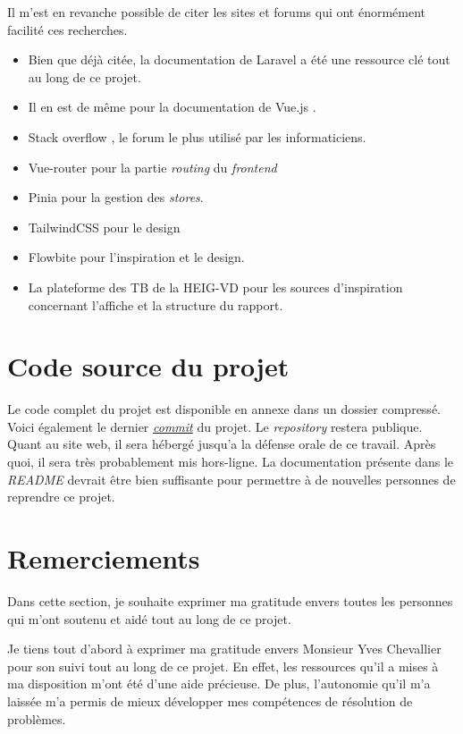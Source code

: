Il m'est en revanche possible de citer les sites et forums qui ont énormément facilité ces recherches.

\begin{itemize}
    \item Bien que déjà citée, la documentation de Laravel \cite{Laravel} a été une ressource clé tout au long de ce projet.
    \item Il en est de même pour la documentation de Vue.js \cite{Vuejs}.
    \item Stack overflow \cite{stackoverflow}, le forum le plus utilisé par les informaticiens.
    \item Vue-router \cite{vueRouter} pour la partie \emph{routing} du \emph{frontend}
    \item Pinia \cite{pinia} pour la gestion des \emph{stores}.
    \item TailwindCSS \cite{TailwindCSS} pour le design
    \item Flowbite \cite{flowbite} pour l'inspiration et le design.
    \item La plateforme des TB de la HEIG-VD \cite{plateformeTB} pour les sources d'inspiration concernant l'affiche et la structure du rapport.
\end{itemize}

\section{Code source du projet}
Le code complet du projet est disponible en annexe dans un dossier compressé. Voici également le dernier \href{https://github.com/Marinlestylo/h-quiz/commit/c1d3a0b859ff09c4d6cca360570cc6c979690d3b}{\emph{commit}} du projet. Le \emph{repository} restera publique. Quant au site web, il sera hébergé jusqu'a la défense orale de ce travail. Après quoi, il sera très probablement mis hors-ligne.
La documentation présente dans le \emph{README} devrait être bien suffisante pour permettre à de nouvelles personnes de reprendre ce projet.

\section{Remerciements}
Dans cette section, je souhaite exprimer ma gratitude envers toutes les personnes qui m'ont soutenu et aidé tout au long de ce projet.

Je tiens tout d'abord à exprimer ma gratitude envers Monsieur Yves Chevallier pour son suivi tout au long de ce projet. En effet, les ressources qu'il a mises à ma disposition m'ont été d'une aide précieuse. De plus, l'autonomie qu'il m'a laissée m'a permis de mieux développer mes compétences de résolution de problèmes.

